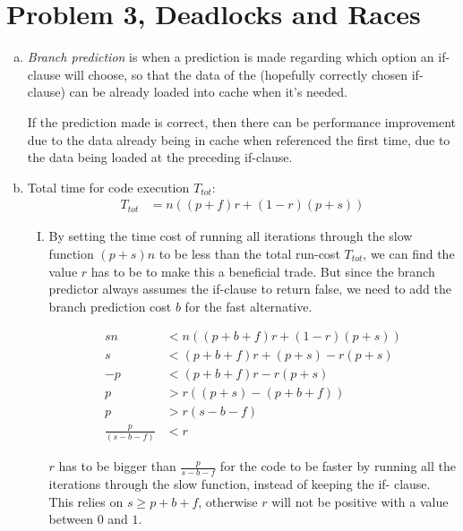 \documentclass[fontsize=11pt, paper=a4, titlepage]{article}
\begin{document}
\section{Problem 3, Deadlocks and Races}
\begin{enumerate}[a)]

    \item \textit{Branch prediction} is when a prediction is made regarding
which  option an if-clause will choose, so that the data of the (hopefully correctly chosen if-clause) can be already loaded into cache when it's needed.

If the prediction made is correct, then there can be performance improvement due
to the data already being in cache when referenced the first time, due to the
data being loaded at the preceding if-clause.

    \item Total time for code execution $T_{tot}$:
    \begin{align*}
        T_{tot} &= n((p+f)r + (1-r)(p+s))
    \end{align*}

    \begin{enumerate}[I)]

        \item By setting the time cost of running all iterations through the
slow function $(p+s)n$ to be less than the total run-cost $T_{tot}$, we can find
the value $r$ has to be to make this a beneficial trade. But since the branch
predictor always assumes the if-clause to return false, we need to add the
branch prediction cost $b$ for the fast alternative.

        \begin{align*}
            sn &< n((p+b+f)r + (1-r)(p+s)) \\
            s &< (p+b+f)r + (p+s) - r(p+s) \\
            -p &< (p+b+f)r - r(p+s) \\
            p &> r((p+s) - (p+b+f)) \\
            p &> r(s-b-f) \\
            \frac{p}{(s-b-f)} &< r
        \end{align*}

$r$ has to be bigger than $\frac{p}{s-b-f}$ for the code to be faster by
running all the iterations through the slow function, instead of keeping the if-
clause. This relies on $s \ge p+b+f$, otherwise $r$ will not be positive with
a value between $0$ and $1$.


\end{enumerate}
\end{enumerate}
\end{document}
